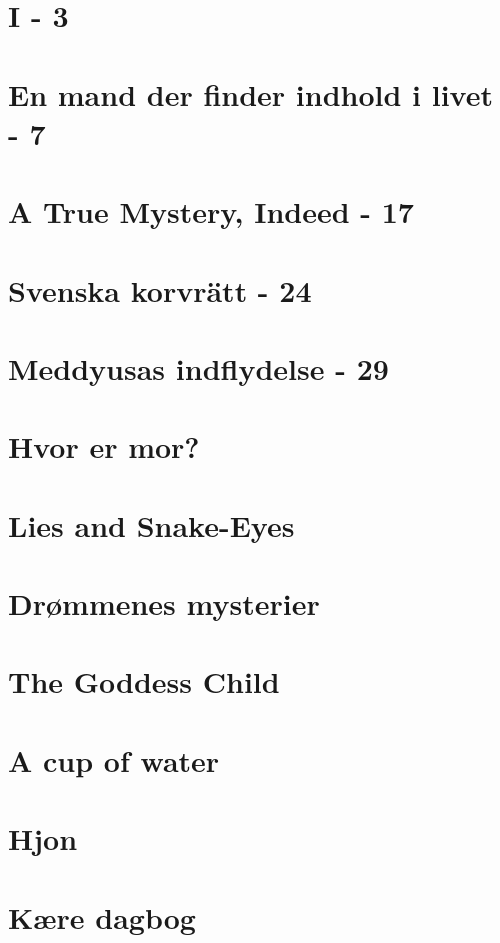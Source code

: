 \documentclass[]{article}
\begin{document}
\section{I - 3}

\section{En mand der finder indhold i livet - 7}

\section{A True Mystery, Indeed - 17}

\section{Svenska korvrätt - 24}

\section{Meddyusas indflydelse - 29}

\section{Hvor er mor?}

\section{Lies and Snake-Eyes}

\section{Drømmenes mysterier}

\section{The Goddess Child}

\section{A cup of water}

\section{Hjon}

\section{Kære dagbog}
\end{document}
